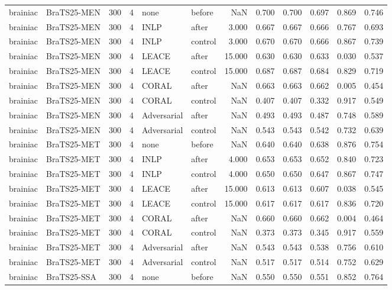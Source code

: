 \begin{tabular}{llrrllrrrrrr}
brainiac & BraTS25-MEN & 300 & 4 & none & before & NaN & 0.700 & 0.700 & 0.697 & 0.869 & 0.746 \\
brainiac & BraTS25-MEN & 300 & 4 & INLP & after & 3.000 & 0.667 & 0.667 & 0.666 & 0.767 & 0.693 \\
brainiac & BraTS25-MEN & 300 & 4 & INLP & control & 3.000 & 0.670 & 0.670 & 0.666 & 0.867 & 0.739 \\
brainiac & BraTS25-MEN & 300 & 4 & LEACE & after & 15.000 & 0.630 & 0.630 & 0.633 & 0.030 & 0.537 \\
brainiac & BraTS25-MEN & 300 & 4 & LEACE & control & 15.000 & 0.687 & 0.687 & 0.684 & 0.829 & 0.719 \\
brainiac & BraTS25-MEN & 300 & 4 & CORAL & after & NaN & 0.663 & 0.663 & 0.662 & 0.005 & 0.454 \\
brainiac & BraTS25-MEN & 300 & 4 & CORAL & control & NaN & 0.407 & 0.407 & 0.332 & 0.917 & 0.549 \\
brainiac & BraTS25-MEN & 300 & 4 & Adversarial & after & NaN & 0.493 & 0.493 & 0.487 & 0.748 & 0.589 \\
brainiac & BraTS25-MEN & 300 & 4 & Adversarial & control & NaN & 0.543 & 0.543 & 0.542 & 0.732 & 0.639 \\
brainiac & BraTS25-MET & 300 & 4 & none & before & NaN & 0.640 & 0.640 & 0.638 & 0.876 & 0.754 \\
brainiac & BraTS25-MET & 300 & 4 & INLP & after & 4.000 & 0.653 & 0.653 & 0.652 & 0.840 & 0.723 \\
brainiac & BraTS25-MET & 300 & 4 & INLP & control & 4.000 & 0.650 & 0.650 & 0.647 & 0.867 & 0.747 \\
brainiac & BraTS25-MET & 300 & 4 & LEACE & after & 15.000 & 0.613 & 0.613 & 0.607 & 0.038 & 0.545 \\
brainiac & BraTS25-MET & 300 & 4 & LEACE & control & 15.000 & 0.617 & 0.617 & 0.617 & 0.836 & 0.720 \\
brainiac & BraTS25-MET & 300 & 4 & CORAL & after & NaN & 0.660 & 0.660 & 0.662 & 0.004 & 0.464 \\
brainiac & BraTS25-MET & 300 & 4 & CORAL & control & NaN & 0.373 & 0.373 & 0.345 & 0.917 & 0.559 \\
brainiac & BraTS25-MET & 300 & 4 & Adversarial & after & NaN & 0.543 & 0.543 & 0.538 & 0.756 & 0.610 \\
brainiac & BraTS25-MET & 300 & 4 & Adversarial & control & NaN & 0.517 & 0.517 & 0.514 & 0.752 & 0.629 \\
brainiac & BraTS25-SSA & 300 & 4 & none & before & NaN & 0.550 & 0.550 & 0.551 & 0.852 & 0.764 \\

\end{tabular}

